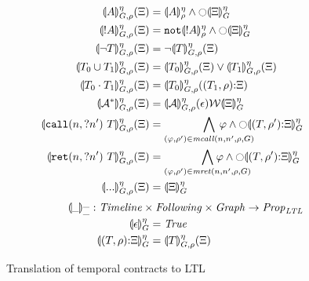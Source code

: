 \documentclass[preprint,onecolumn,9pt]{sigplanconf} %
\begin{document}
\begin{figure}
  \begin{align*}
   \toltl{\mtimeline}{\mevent}{\mgraph}{\menv}{\mtestack} &=
     \ltland{\denoteevent{\mevent}{\menv}{\mtimeline}}
            {\ltlnext{\stacktoltl{\mtimeline}{\mtestack}{\mgraph}}}
    \\
    \toltl{\mtimeline}{\snonevent{\mevent}}{\mgraph}{\menv}{\mtestack} &=
      \ltland{\apneg{\denoteevent{\snonevent{\mevent}}{\menv}{\mtimeline}}}
             {\ltlnext{\stacktoltl{\mtimeline}{\mtestack}{\mgraph}}}
    \\
    \toltl{\mtimeline}{\stnot{\mtcon}}{\mgraph}{\menv}{\mtestack} &=
      \ltlnot{\toltl{\mtimeline}{\mtcon}{\mgraph}{\menv}{\mtestack}}
    \\
    \toltl{\mtimeline}{\stOr{\mtcon_0}{\mtcon_1}}{\mgraph}{\menv}{\mtestack} &=
      \ltlor{\toltl{\mtimeline}{\mtcon_0}{\mgraph}{\menv}{\mtestack}}
            {\toltl{\mtimeline}{\mtcon_1}{\mgraph}{\menv}{\mtestack}}
    \\
    \toltl{\mtimeline}{\stseq{\mtcon_0}{\mtcon_1}}{\mgraph}{\menv}{\mtestack} &=
      \toltl{\mtimeline}{\mtcon_0}{\mgraph}{\menv}{\cons{(\mtcon_1,\menv)}{\mtestack}}
    \\
    \toltl{\mtimeline}{\stmany{\mtconNoB}}{\mgraph}{\menv}{\mtestack} &=
      \ltlW{\toltl{\mtimeline}{\mtconNoB}{\mgraph}{\menv}{\emptytestack}}{\stacktoltl{\mtimeline}{\mtestack}{\mgraph}}
    \\
    \toltl{\mtimeline}{\stcall{\mname}{\mname'}{\mtcon}}{\mgraph}{\menv}{\mtestack} &=
      \bigwedge\limits_{(\ltlprop,\menv') \in \matchcall(\mname,\mname',\menv,\mgraph)}{
        \mkern-60mu\ltland{\ltlprop}{\ltlnext{\stacktoltl{\mtimeline}{\cons{(\mtcon,\menv')}{\mtestack}}{\mgraph}}}}
    \\
    \toltl{\mtimeline}{\stret{\mname}{\mname'}{\mtcon}}{\mgraph}{\menv}{\mtestack} &=
      \bigwedge\limits_{(\ltlprop,\menv') \in \matchret(\mname,\mname',\menv,\mgraph)}{
        \mkern-60mu\ltland{\ltlprop}{\ltlnext{\stacktoltl{\mtimeline}{\cons{(\mtcon,\menv')}{\mtestack}}{\mgraph}}}}
    \\
      \toltl{\mtimeline}{\sddd}{\mgraph}{\menv}{\mtestack} &= \stacktoltl{\mtimeline}{\mtestack}{\mgraph}
\\[2pt]
    {\scriptsize \stacktoltl{\_}{\_}{\_} : \Timeline \times \TConEnvStack \times \Graph \to \LTLProp} \span\omit
\\
    \stacktoltl{\mtimeline}{\emptytestack}{\mgraph} &= \ltlTrue
\\
    \stacktoltl{\mtimeline}{\cons{(\mtcon,\menv)}{\mtestack}}{\mgraph} &=
      \toltl{\mtimeline}{\mtcon}{\mgraph}{\menv}{\mtestack}
  \end{align*}
  
  \caption{Translation of temporal contracts to LTL}
\label{fig:translation}
\end{figure}
\end{document}
